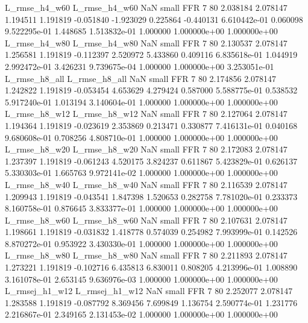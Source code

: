  L_rmse_h4_w60  L_rmse_h4_w60                   NaN      small      FFR                 7 80 2.038184       2.078147 1.194511       1.191819   -0.051840     -1.923029      0.225864    -0.440131   6.610442e-01  0.060098 9.522295e-01     1.448685   1.513832e-01            1.000000    1.000000e+00        1.000000e+00
 L_rmse_h4_w80  L_rmse_h4_w80                   NaN      small      FFR                 7 80 2.130537       2.078147 1.256581       1.191819   -0.112397      2.520972      5.433860     0.409116   6.835618e-01  1.044919 2.992472e-01     3.426231   9.739675e-04            1.000000    1.000000e+00        3.253051e-01
 L_rmse_h8_all  L_rmse_h8_all                   NaN      small      FFR                 7 80 2.174856       2.078147 1.242822       1.191819   -0.053454      4.653629      4.279424     0.587000   5.588775e-01  0.538532 5.917240e-01     1.013194   3.140604e-01            1.000000    1.000000e+00        1.000000e+00
 L_rmse_h8_w12  L_rmse_h8_w12                   NaN      small      FFR                 7 80 2.127064       2.078147 1.194364       1.191819   -0.023619      2.353869      0.213471     0.330877   7.416131e-01  0.040168 9.680608e-01     0.708256   4.808710e-01            1.000000    1.000000e+00        1.000000e+00
 L_rmse_h8_w20  L_rmse_h8_w20                   NaN      small      FFR                 7 80 2.172083       2.078147 1.237397       1.191819   -0.061243      4.520175      3.824237     0.611867   5.423829e-01  0.626137 5.330303e-01     1.665763   9.972141e-02            1.000000    1.000000e+00        1.000000e+00
 L_rmse_h8_w40  L_rmse_h8_w40                   NaN      small      FFR                 7 80 2.116539       2.078147 1.209943       1.191819   -0.043541      1.847398      1.520653     0.282758   7.781020e-01  0.233373 8.160758e-01     0.876645   3.833377e-01            1.000000    1.000000e+00        1.000000e+00
 L_rmse_h8_w60  L_rmse_h8_w60                   NaN      small      FFR                 7 80 2.107631       2.078147 1.198661       1.191819   -0.031832      1.418778      0.574039     0.254982   7.993999e-01  0.142526 8.870272e-01     0.953922   3.430330e-01            1.000000    1.000000e+00        1.000000e+00
 L_rmse_h8_w80  L_rmse_h8_w80                   NaN      small      FFR                 7 80 2.211893       2.078147 1.273221       1.191819   -0.102716      6.435813      6.830011     0.808205   4.213996e-01  1.008890 3.161078e-01     2.653145   9.636976e-03            1.000000    1.000000e+00        1.000000e+00
L_rmsej_h1_w12 L_rmsej_h1_w12                   NaN      small      FFR                 7 80 2.252077       2.078147 1.283588       1.191819   -0.087792      8.369456      7.699849     1.136754   2.590774e-01  1.231776 2.216867e-01     2.349165   2.131453e-02            1.000000    1.000000e+00        1.000000e+00
